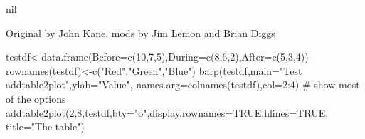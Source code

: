 \begin{Value}
nil
\end{Value}
\begin{Author}\relax
Original by John Kane, mods by Jim Lemon and Brian Diggs
\end{Author}
\begin{SeeAlso}\relax
{}
\end{SeeAlso}
\begin{Examples}
\begin{ExampleCode}
 testdf<-data.frame(Before=c(10,7,5),During=c(8,6,2),After=c(5,3,4))
 rownames(testdf)<-c("Red","Green","Blue")
 barp(testdf,main="Test addtable2plot",ylab="Value",
  names.arg=colnames(testdf),col=2:4)
 # show most of the options
 addtable2plot(2,8,testdf,bty="o",display.rownames=TRUE,hlines=TRUE,
  title="The table")
\end{ExampleCode}
\end{Examples}

